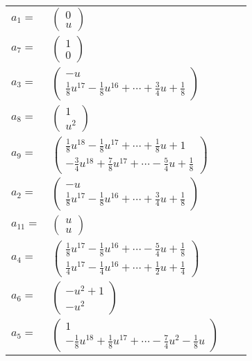 \documentclass[1p]{elsarticle_modified}
\theoremstyle{definition}
\begin{document}
\begin{tabular}{m{7pt} m{180pt} m{7pt} m{180pt} }
\flushright $a_{1}=$&$\begin{pmatrix}0\\u\end{pmatrix}$ \\
\flushright $a_{7}=$&$\begin{pmatrix}1\\0\end{pmatrix}$ \\
\flushright $a_{3}=$&$\begin{pmatrix}- u\\\frac{1}{8} u^{17}-\frac{1}{8} u^{16}+\cdots+\frac{3}{4} u+\frac{1}{8}\end{pmatrix}$ \\
\flushright $a_{8}=$&$\begin{pmatrix}1\\u^2\end{pmatrix}$ \\
\flushright $a_{9}=$&$\begin{pmatrix}\frac{1}{8} u^{18}-\frac{1}{8} u^{17}+\cdots+\frac{1}{8} u+1\\-\frac{3}{4} u^{18}+\frac{7}{8} u^{17}+\cdots-\frac{5}{4} u+\frac{1}{8}\end{pmatrix}$ \\
\flushright $a_{2}=$&$\begin{pmatrix}- u\\\frac{1}{8} u^{17}-\frac{1}{8} u^{16}+\cdots+\frac{3}{4} u+\frac{1}{8}\end{pmatrix}$ \\
\flushright $a_{11}=$&$\begin{pmatrix}u\\u\end{pmatrix}$ \\
\flushright $a_{4}=$&$\begin{pmatrix}\frac{1}{8} u^{17}-\frac{1}{8} u^{16}+\cdots-\frac{5}{4} u+\frac{1}{8}\\\frac{1}{4} u^{17}-\frac{1}{4} u^{16}+\cdots+\frac{1}{2} u+\frac{1}{4}\end{pmatrix}$ \\
\flushright $a_{6}=$&$\begin{pmatrix}- u^2+1\\- u^2\end{pmatrix}$ \\
\flushright $a_{5}=$&$\begin{pmatrix}1\\-\frac{1}{8} u^{18}+\frac{1}{8} u^{17}+\cdots-\frac{7}{4} u^2-\frac{1}{8} u\end{pmatrix}$ \\

\end{tabular}
\end{document}
